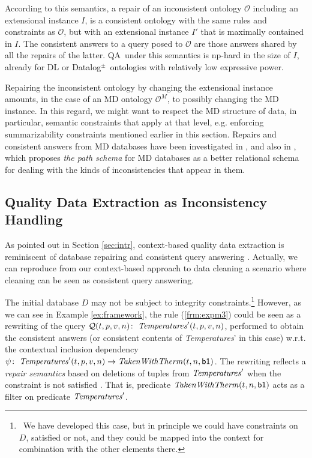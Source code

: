 \documentclass[format=acmsmall, review=false, screen=true]{acmart}
\newcommand{\mc}[1]{\mathcal{ #1}}
\newcommand{\nit}[1]{{\it #1}}
\newcommand{\dpm}{{Datalog}$^\pm$}
\newcommand{\qa}{QA}
\newcommand{\np}{{\sc np}}
\begin{document}
 According to this semantics, a repair of an inconsistent ontology $\mc{O}$ including an extensional instance $I$, is a consistent ontology with the same rules and constraints as $\mc{O}$, but with an extensional instance  $I'$ that is maximally contained in $I$. The consistent answers to a query posed to $\mc{O}$ are those answers shared by all the repairs of the latter.
\qa \ under this semantics is \np-hard in the size of $I$, already for DL \cite{lembo15} or \dpm \ ontologies \cite{lukasiewicz12,lukasiewicz15} with relatively low expressive power.


Repairing the inconsistent ontology by changing the extensional instance amounts, in the case of an MD ontology $\mc{O}^M$, to possibly changing the MD instance. In this regard, we might want to respect the MD structure of data, in particular, semantic constraints that apply at that level, e.g. enforcing summarizability constraints mentioned earlier in this section. Repairs and consistent answers from MD databases have been investigated in
 \cite{amw09,sinaAMW,sina}, and also in \cite{maka}, which proposes  {\em the path  schema} for MD databases as a better relational schema for dealing with the kinds of inconsistencies that appear in them.



\subsection{Quality Data Extraction as Inconsistency Handling}\label{sec:repairs}

As pointed out in Section \ref{sec:intr}, context-based quality data extraction is reminiscent of database repairing and consistent query answering
\cite{bertossi11,bertossi06}. Actually, we can reproduce from our context-based approach to data cleaning a scenario where cleaning can be seen as consistent query answering.

The initial database $D$ may not be subject to integrity constraints.\footnote{\ We have developed this case, but in principle we could have constraints on $D$, satisfied or not, and they could be mapped into the context for combination with the other elements there.} However, as we can see  in Example \ref{ex:framework}, the rule (\ref{frm:expm3}) could be seen as a rewriting of the query $\mc{Q}(t,p,v,n)\!: \  {\it Temperatures}'(t,p,v,n)$, performed
to obtain the consistent answers (or consistent contents of {\it Temperatures}' in this case) w.r.t. the contextual inclusion dependency  \ $\psi\!: \ {\it Temperatures}'(t,p,v,n) \rightarrow {\it TakenWithTherm}(t,n,{\sf b1})$.
The rewriting reflects a {\em repair semantics} based on deletions of tuples from  ${\it Temperatures}'$ when the constraint is not satisfied \cite{bertossi11}. That is, predicate $\nit{TakenWithTherm}(t,n,{\sf b1})$ acts as a filter on
predicate ${\it Temperatures}'$.
\end{document}
